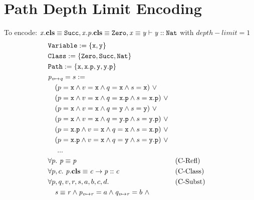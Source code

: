 \documentclass[a4paper]{article}
\begin{document}
\section{Path Depth Limit Encoding}
To encode: $\mathit{x}.\textbf{cls} \equiv \mathit{\mathtt{Succ}}, \mathit{x.p}.\textbf{cls} \equiv \mathit{\mathtt{Zero}}, \mathit{x} \equiv \mathit{y} \vdash \mathit{y} :: \mathit{\mathtt{Nat}}$
with $\mathit{depth\!\!-\!\!limit}=1$
\begin{align}
  &\texttt{\Variable} := \{\mathtt{x}, \mathtt{y}\}\\
  &\texttt{\Class} := \{\Zero,\Succ,\Nat\}\\
  &\texttt{\Path} := \{\mathtt{x}, \mathtt{x}.\mathtt{p}, \mathtt{y}, \mathtt{y}.\mathtt{p}\}\\
  &\subst{p}{v}{q} = s :=\\
  &\quad (p=\mathtt{x} \land v=\mathtt{x} \land q=\mathtt{x} \land s=\mathtt{x})~\lor\\
  &\quad (p=\mathtt{x} \land v=\mathtt{x} \land q=\mathtt{x.p} \land s=\mathtt{x.p})~\lor\\
  &\quad (p=\mathtt{x} \land v=\mathtt{x} \land q=\mathtt{y} \land s=\mathtt{y})~\lor\\
  &\quad (p=\mathtt{x} \land v=\mathtt{x} \land q=\mathtt{y.p} \land s=\mathtt{y.p})~\lor\\
  &\quad (p=\mathtt{x.p} \land v=\mathtt{x} \land q=\mathtt{x} \land s=\mathtt{x.p})~\lor\\
  &\quad (p=\mathtt{x.p} \land v=\mathtt{x} \land q=\mathtt{y} \land s=\mathtt{y.p})~\lor\\
  &\quad~...\\
  &\forall p.~\pathEq{p}{p} && \text{(C-Refl)}\\
  &\forall p, c.~\instBy{p}{c} \rightarrow \instOf{p}{c} && \text{(C-Class)}\\
  &\forall p, q, v, r, s, a, b, c, d. && \text{(C-Subst)}\\
  &\quad \pathEq{s}{r} \land \subst{p}{v}{r}=a \land \subst{q}{v}{r}=b~\land\\

\end{align}
\end{document}

